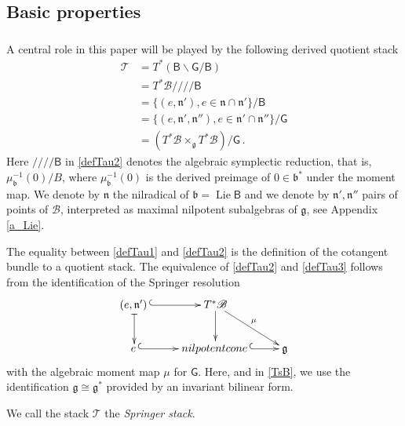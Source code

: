 \documentclass[14pt]{extarticle}
\newcommand{\bG}{\mathsf{G}}
\newcommand{\bB}{\mathsf{B}}
\newcommand{\cB}{\mathscr{B}}
\newcommand{\fg}{\mathfrak{g}}
\newcommand{\fn}{\mathfrak{n}}
\newcommand{\fb}{\mathfrak{b}}
\newcommand{\rd}{/\!\!/\!\!/\!\!/}
\newcommand{\Tau}{\mathscr{T}}
\DeclareMathOperator{\Lie}{Lie}
\theoremstyle{definition}
\begin{document}
\subsection{Basic properties}



\subsubsection{}
A central role in this paper will be played by the following derived quotient
stack
%
\begin{align}
  \label{defTau1}
  \Tau &= T^* (\bB \backslash \bG /\bB) \\
       & = T^* \cB \rd \bB \label{defTau2}\\
       & = \{ (e,\fn') , e \in \fn \cap \fn'\} / \bB \label{defTau3}\\
       & = \{ (e,\fn',\fn''), e \in \fn' \cap \fn''\} /
         \bG \label{defTau4} \\
      & = \left(T^*\cB \times_\fg T^*\cB \right) / \bG \label{defTcT} \,.
\end{align}
%
Here $\rd \bB$ in \eqref{defTau2} denotes the algebraic
symplectic reduction, that is, $\mu_\fb^{-1}(0)/B$, where
$\mu_\fb^{-1}(0)$ is the derived preimage of $0\in \fb^*$
under the moment map. We denote by $\fn$ the nilradical of
$\fb = \Lie \bB$ and we denote by $\fn',\fn''$ pairs of points of
$\cB$, interpreted as  
maximal nilpotent subalgebras of $\fg$, see Appendix \ref{a_Lie}. 


The equality between \eqref{defTau1} and
\eqref{defTau2} is the definition of the cotangent bundle to a
quotient stack. The equivalence of \eqref{defTau2} and \eqref{defTau3} follows from
the identification of the Springer resolution
%
\begin{equation}
  \label{Springer}
  \xymatrix{  (e, \fn')\, \ar@{|->}[d]\ar@{^{(}->}[r]& T^*\cB \ar[d] \ar[dr]^{\mu} \\
    e\, \ar@{^{(}->}[r] & \textup{nilpotent cone} \,\ar@{^{(}->}[r] & \fg
    }
  \end{equation}
with the algebraic moment map $\mu$ for $\bG$. Here, and in
\eqref{TsB}, we use the identification
$\fg \cong \fg^*$ provided by an invariant bilinear form.

We call the stack 
 $\Tau$ the \emph{Springer stack}.

\subsubsection{}
\end{document}
